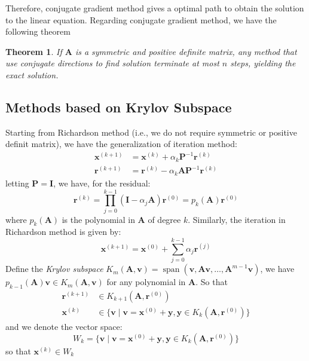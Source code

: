 \documentclass{article}
\DeclareMathOperator{\spn}{span}
\newtheorem*{theorem}{Theorem}
\begin{document}
Therefore, conjugate gradient method gives a optimal path to obtain the solution to the linear equation.
Regarding conjugate gradient method, we have the following theorem 
\begin{theorem}
If $\mathbf{A}$ is a symmetric and positive definite matrix, any method that use 
conjugate directions to find solution terminate at most $n$ steps, yielding the exact solution.    
\end{theorem}

\subsection{Methods based on Krylov Subspace}
Starting from Richardson method (i.e., we do not require symmetric or positive definit matrix), 
we have the generalization of iteration method:
\begin{align*}
    \mathbf{x}^{(k+1)} &= \mathbf{x}^{(k)} + \alpha_k \mathbf{P}^{-1}\mathbf{r}^{(k)} \\
    \mathbf{r}^{(k+1)} &= \mathbf{r}^{(k)} - \alpha_k \mathbf{A} \mathbf{P}^{-1}\mathbf{r}^{(k)}
\end{align*}
letting $\mathbf{P} = \mathbf{I}$, we have, for the residual:
\begin{equation}
    \mathbf{r}^{(k)} = \prod_{j=0}^{k-1} \left(\mathbf{I} - \alpha_j \mathbf{A}\right) \mathbf{r}^{(0)} 
    = p_k(\mathbf{A}) \mathbf{r}^{(0)}
\end{equation}
where $p_k(\mathbf{A})$ is the polynomial in $\mathbf{A}$ of degree $k$. Similarly, the iteration 
in Richardson method is given by:
\begin{equation}
    \mathbf{x}^{(k+1)} = \mathbf{x}^{(0)} + \sum_{j=0}^{k-1} \alpha_j \mathbf{r}^{(j)}
\end{equation}
Define the \emph{Krylov subspace}
$K_m(\mathbf{A},\mathbf{v}) = \spn( \mathbf{v}, \mathbf{A}\mathbf{v}, \dots, \mathbf{A}^{m-1}\mathbf{v} )$,
we have $p_{k-1}(\mathbf{A}) \mathbf{v} \in K_m(\mathbf{A},\mathbf{v})$ for any polynomial in $\mathbf{A}$.
So that 
\begin{align*}
    \mathbf{r}^{(k+1)} &\in K_{k+1}(\mathbf{A},\mathbf{r}^{(0)}) \\
    \mathbf{x}^{(k)} &\in \{\mathbf{v}\mid \mathbf{v} = \mathbf{x}^{(0)} + \mathbf{y}, \mathbf{y} \in K_{k}(\mathbf{A},\mathbf{r}^{(0)})\}
\end{align*}
and we denote the vector space:
\begin{equation}
    W_k = \{\mathbf{v}\mid \mathbf{v} = \mathbf{x}^{(0)} + \mathbf{y}, \mathbf{y} \in K_{k}(\mathbf{A},\mathbf{r}^{(0)})\}
\end{equation}
so that $\mathbf{x}^{(k)} \in W_k$
\end{document}
